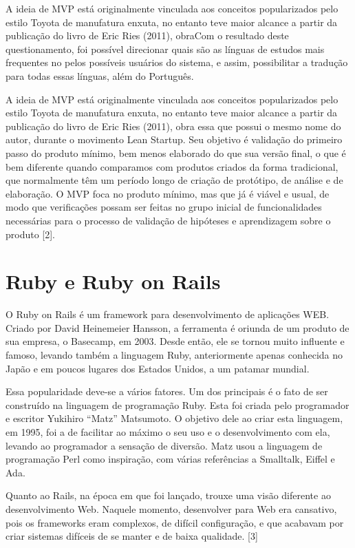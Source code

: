 A ideia de MVP está originalmente vinculada aos conceitos popularizados pelo estilo Toyota de manufatura enxuta, no entanto teve maior alcance a partir da publicação do livro de Eric Ries (2011), obraCom o resultado deste questionamento, foi possível direcionar quais são as línguas de estudos mais frequentes no pelos possíveis usuários do sistema, e assim, possibilitar a tradução para todas essas línguas, além do Português.

A ideia de MVP está originalmente vinculada aos conceitos popularizados pelo estilo Toyota de manufatura enxuta, no entanto teve maior alcance a partir da publicação do livro de Eric Ries (2011), obra essa que possui o mesmo nome do autor, durante o movimento Lean Startup. Seu objetivo é validação do primeiro passo do produto mínimo, bem menos elaborado do que sua versão final, o que é bem diferente quando comparamos com produtos criados da forma tradicional, que normalmente têm um período longo de criação de protótipo, de análise e de elaboração. O MVP foca no produto mínimo, mas que já é viável e usual, de modo que verificações possam ser feitas no grupo inicial de funcionalidades necessárias para o processo de validação de hipóteses e aprendizagem sobre o produto [2].

\section{Ruby e Ruby on Rails}

O Ruby on Rails é um framework para desenvolvimento de aplicações WEB. Criado por David Heinemeier Hansson, a ferramenta é oriunda de um produto de sua empresa, o Basecamp, em 2003. Desde então, ele se tornou muito influente e famoso, levando também a linguagem Ruby, anteriormente apenas conhecida no Japão e em poucos lugares dos Estados Unidos, a um patamar mundial.

Essa popularidade deve-se a vários fatores. Um dos principais é o fato de ser construído na linguagem de programação Ruby. Esta foi criada pelo programador e escritor Yukihiro “Matz” Matsumoto. O objetivo dele ao criar esta linguagem, em 1995, foi a de facilitar ao máximo o seu uso e o desenvolvimento com ela, levando ao programador a sensação de diversão. Matz usou a linguagem de programação Perl como inspiração, com várias referências a Smalltalk, Eiffel e Ada.

Quanto ao Rails, na época em que foi lançado, trouxe uma visão diferente ao desenvolvimento Web. Naquele momento, desenvolver para Web era cansativo, pois os frameworks eram complexos, de difícil configuração, e que acabavam por criar sistemas difíceis de se manter e de baixa qualidade. [3]

